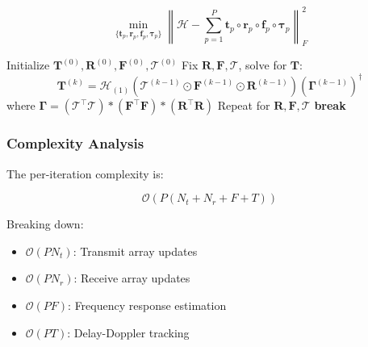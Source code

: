 \documentclass[11pt]{article}
\newcommand\0{\mathbf{0}}
\newcommand\<{\langle}
\renewcommand\>{\rangle}
\begin{document}
    \begin{equation}
        \min_{\{\mathbf{t}_p,\mathbf{r}_p,\mathbf{f}_p,\boldsymbol{\tau}_p\}} \left\| \mathcal{H} - \sum_{p=1}^P \mathbf{t}_p \circ \mathbf{r}_p \circ \mathbf{f}_p \circ \boldsymbol{\tau}_p \right\|_F^2
    \end{equation}
    
    \begin{algorithm}[H]
    \caption{CPD-ALS for MIMO Channel Estimation}
    \begin{algorithmic}[1]
    \State Initialize \(\mathbf{T}^{(0)}, \mathbf{R}^{(0)}, \mathbf{F}^{(0)}, \mathbf{\mathcal{T}}^{(0)}\)
        \State Fix \(\mathbf{R}, \mathbf{F}, \mathbf{\mathcal{T}}\), solve for \(\mathbf{T}\):
        \[
        \mathbf{T}^{(k)} = \mathcal{H}_{(1)}(\mathbf{\mathcal{T}}^{(k-1)} \odot \mathbf{F}^{(k-1)} \odot \mathbf{R}^{(k-1)})(\mathbf{\Gamma}^{(k-1)})^\dagger
        \]
        where \(\mathbf{\Gamma} = (\mathbf{\mathcal{T}}^\top\mathbf{\mathcal{T}}) \ast (\mathbf{F}^\top\mathbf{F}) \ast (\mathbf{R}^\top\mathbf{R})\)
        \State Repeat for \(\mathbf{R}, \mathbf{F}, \mathbf{\mathcal{T}}\)
         \textbf{break}
    \EndFor
    \end{algorithmic}
    \end{algorithm}
    
    \subsubsection{Complexity Analysis}
    The per-iteration complexity is:
    
    \begin{equation}
    \mathcal{O}\left(P(N_t + N_r + F + T)\right)
    \end{equation}
    
    Breaking down:
    \begin{itemize}
        \item \(\mathcal{O}(PN_t)\): Transmit array updates
        \item \(\mathcal{O}(PN_r)\): Receive array updates  
        \item \(\mathcal{O}(PF)\): Frequency response estimation
        \item \(\mathcal{O}(PT)\): Delay-Doppler tracking
    \end{itemize}
    
\end{document}
